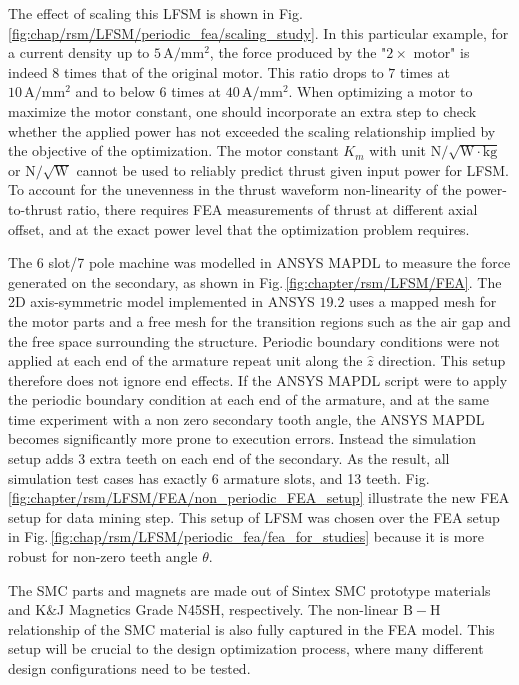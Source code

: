     
            The effect of scaling this \acs{LFSM} is shown in Fig.\,\ref{fig:chap/rsm/LFSM/periodic_fea/scaling_study}. In this particular example, for a current density up to $5\,\mathrm{A/ mm^2}$, the force produced by the "$2\times$ motor" is indeed $8$ times that of the original motor. This ratio drops to $7$ times at $10\,\mathrm{A/ mm^2}$ and to below $6$ times at $40\,\mathrm{A/ mm^2}$. When optimizing a motor to maximize the motor constant, one should incorporate an extra step to check whether the applied power has not exceeded the scaling relationship implied by the objective of the optimization. The motor constant $K_m$ with unit $\mathrm{N/\sqrt{W\cdot kg}}$ or $\mathrm{N/\sqrt{W}}$ cannot be used to reliably predict thrust given input power for \acs{LFSM}. To account for the unevenness in the thrust waveform non-linearity of the power-to-thrust ratio, there requires \acs{FEA} measurements of thrust at different axial offset, and at the exact power level that the optimization problem requires.
            

            The 6 slot/7 pole machine was modelled in ANSYS MAPDL to measure the force generated on the secondary, as shown in Fig.\,\ref{fig:chapter/rsm/LFSM/FEA}. The 2D axis-symmetric model implemented in ANSYS  $19.2$ uses a mapped mesh for the motor parts and a free mesh for the transition regions such as the air gap and the free space surrounding the structure. Periodic boundary conditions were not applied at each end of the armature repeat unit along the $\hat{z}$ direction. This setup therefore does not ignore end effects. If the ANSYS MAPDL script were to apply the periodic boundary condition at each end of the armature, and at the same time experiment with a non zero secondary tooth angle, the ANSYS MAPDL becomes significantly more prone to execution errors. Instead the simulation setup adds 3 extra teeth on each end of the secondary. As the result, all simulation test cases has exactly 6 armature slots, and 13 teeth. Fig.\,\ref{fig:chapter/rsm/LFSM/FEA/non_periodic_FEA_setup} illustrate the new \acs{FEA} setup for data mining step. This setup of \acs{LFSM} was chosen over the \acs{FEA} setup in Fig.\,\ref{fig:chap/rsm/LFSM/periodic_fea/fea_for_studies} because it is more robust for non-zero teeth angle $\theta$.
            

            The \acs{SMC} parts and magnets are made out of Sintex \acs{SMC} prototype materials and K$\&$J Magnetics Grade N45SH, respectively. The non-linear $\mathrm{B-H}$ relationship of the \acs{SMC} material is also fully captured in the FEA model. This setup will be crucial to the design optimization process, where many different design configurations need to be tested.
            
